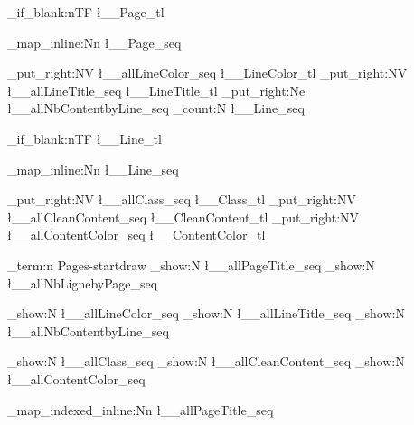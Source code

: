 {{{            %
            \tl_if_blank:nTF {\l__Page_tl}
                {}%
                {%
                \seq_map_inline:Nn \l__Page_seq
                    {                   
                    
                    \seq_put_right:NV \l__allLineColor_seq \l__LineColor_tl
                    \seq_put_right:NV \l__allLineTitle_seq \l__LineTitle_tl
                    \seq_put_right:Ne \l__allNbContentbyLine_seq {\seq_count:N \l__Line_seq}
                    
                    \tl_if_blank:nTF {\l__Line_tl}
                        {}%
                        {%
                        \seq_map_inline:Nn \l__Line_seq
                            {                   
                                
                                \seq_put_right:NV \l__allClass_seq \l__Class_tl
                                \seq_put_right:NV \l__allCleanContent_seq \l__CleanContent_tl
                                \seq_put_right:NV \l__allContentColor_seq \l__ContentColor_tl
                                
                            }
                        }
                    }
                }
            }
        }

        \iow_term:n {Pages-startdraw}
        \seq_show:N \l__allPageTitle_seq
        \seq_show:N \l__allNbLignebyPage_seq
    
        \seq_show:N \l__allLineColor_seq
        \seq_show:N \l__allLineTitle_seq
        \seq_show:N \l__allNbContentbyLine_seq
    
        \seq_show:N \l__allClass_seq
        \seq_show:N \l__allCleanContent_seq
        \seq_show:N \l__allContentColor_seq


    \seq_map_indexed_inline:Nn \l__allPageTitle_seq
    {%

        
}}
